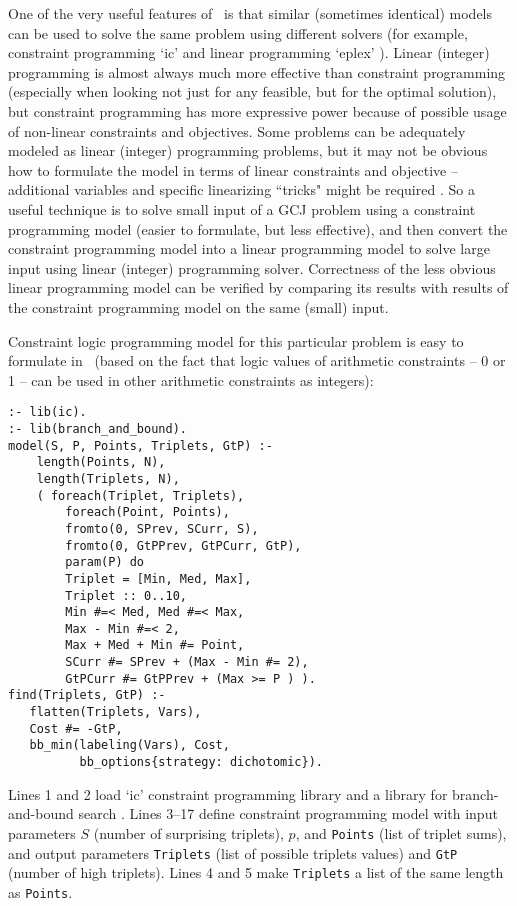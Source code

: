 \documentclass{acm_proc_article-sp}
\begin{document}
One of the very useful features of \eclipse\ is that similar (sometimes identical) models can be used to solve the same problem using different solvers
(for example, constraint programming `ic' and linear programming `eplex' \cite{shen2005eplex}).
Linear (integer) programming is almost always much more effective than constraint programming (especially when looking not just for any feasible, but for the optimal solution), 
but constraint programming has more expressive power because of possible usage of non-linear constraints and objectives.
Some problems can be adequately modeled as linear (integer) programming problems, but it may not be obvious how to formulate the model in terms of linear constraints and objective --
additional variables and specific linearizing ``tricks" might be required \cite{williams2013model,aimms-model,lpsolve-abs}.
So a useful technique is to solve small input of a GCJ problem using a constraint programming model (easier to formulate, but less effective), 
and then convert the constraint programming model into a linear programming model to solve large input using linear (integer) programming solver.
Correctness of the less obvious linear programming model can be verified by comparing its results with results of the constraint programming model on the same (small) input.

Constraint logic programming model for this particular problem is easy to formulate in \eclipse\ 
(based on the fact that logic values of arithmetic constraints -- 0 or 1 -- can be used in other arithmetic constraints as integers):

\begin{lstlisting}[caption={Constraint programming solution for ``Dancing With the Googlers''}]
:- lib(ic).
:- lib(branch_and_bound).
model(S, P, Points, Triplets, GtP) :-
    length(Points, N),
    length(Triplets, N),
    ( foreach(Triplet, Triplets), 
        foreach(Point, Points), 
        fromto(0, SPrev, SCurr, S), 
        fromto(0, GtPPrev, GtPCurr, GtP), 
        param(P) do
        Triplet = [Min, Med, Max],
        Triplet :: 0..10,
        Min #=< Med, Med #=< Max,
        Max - Min #=< 2,
        Max + Med + Min #= Point,
        SCurr #= SPrev + (Max - Min #= 2),
        GtPCurr #= GtPPrev + (Max >= P ) ).
find(Triplets, GtP) :-
   flatten(Triplets, Vars),
   Cost #= -GtP,
   bb_min(labeling(Vars), Cost, 
          bb_options{strategy: dichotomic}).
\end{lstlisting}

Lines 1 and 2 load `ic' constraint programming library and a library for branch-and-bound search \cite{eclipse-library-manual}.
Lines 3--17 define constraint programming model with input parameters $S$ (number of surprising triplets), $p$, and \texttt{Points} (list of triplet sums), 
and output parameters \texttt{Triplets} (list of possible triplets values) and \texttt{GtP} (number of high triplets).
Lines 4 and 5 make \texttt{Triplets} a list of the same length as \texttt{Points}.
\end{document}
